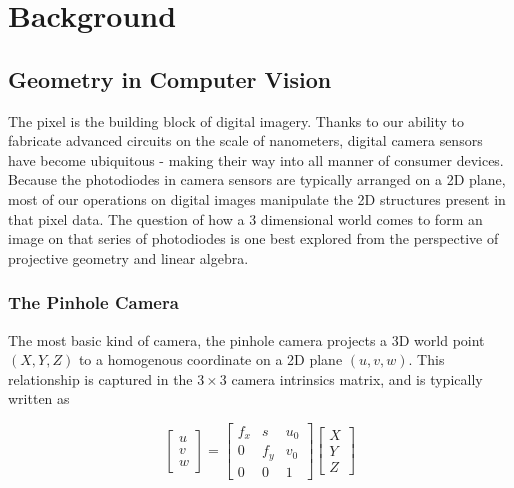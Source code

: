 \documentclass[openany]{book}
\begin{document}
\chapter{Background}

\section{Geometry in Computer Vision}

The pixel is the building block of digital imagery. Thanks to our ability to fabricate advanced circuits on the scale of nanometers, digital camera sensors have become ubiquitous - making their way into all manner of consumer devices. Because the photodiodes in camera sensors are typically arranged on a 2D plane, most of our operations on digital images manipulate the 2D structures present in that pixel data. The question of how a 3 dimensional world comes to form an image on that series of photodiodes is one best explored from the perspective of projective geometry and linear algebra. 

\subsection{The Pinhole Camera}

The most basic kind of camera, the pinhole camera projects a 3D world point $(X, Y, Z)$ to a homogenous coordinate on a 2D plane $(u, v, w)$. This relationship is captured in the $3 \times 3$ camera intrinsics matrix, and is typically written as 

\begin{equation}
\begin{bmatrix}
    u\\
    v\\
    w
\end{bmatrix} = 
\begin{bmatrix}
    f_x & s & u_0 \\ 
    0 & f_y  & v_0 \\ 
    0 & 0 & 1 
\end{bmatrix}
\begin{bmatrix}
    X \\
    Y \\
    Z
\end{bmatrix}
\end{equation}
\end{document}
